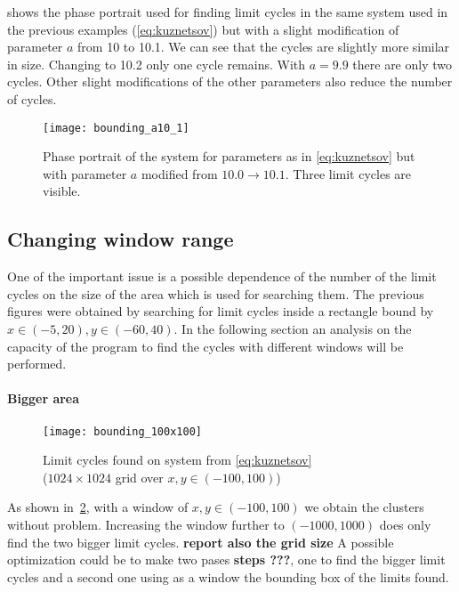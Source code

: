  shows the phase portrait used for finding limit cycles in the same system used in the previous examples (\cref{eq:kuznetsov}) but with a slight modification of parameter $a$ from 10 to 10.1. We can see that the cycles are slightly more similar in size. Changing to 10.2 only one cycle remains. With $a = 9.9$ there are only two cycles. Other slight modifications of the other parameters also reduce the number of cycles.

\begin{figure}[H]
    \centering
    \texttt{[image: bounding\_a10\_1]}
    \caption{Phase portrait of the system for parameters as in \cref{eq:kuznetsov} but with parameter $a$ modified from $10.0 \to 10.1$. Three limit cycles are visible.
    }
    \label{fig:bounding_a10_1}
\end{figure}

\pagebreak
\subsection{Changing window range}
One of the important issue is a possible dependence of the number of the limit cycles on the size of the area which is used for searching them. The previous figures were obtained by searching for limit cycles inside a rectangle bound by $x \in (-5, 20), y \in (-60, 40)$. In the following section an analysis on the capacity of the program to find the cycles with different windows will be performed.

\paragraph{Bigger area}

\begin{figure}[H]
    \centering
    \texttt{[image: bounding\_100x100]}
    \caption{Limit cycles found on system from \cref{eq:kuznetsov} \\
        ($1024 \times 1024$ grid over $x, y \in (-100, 100)$)
    }%
    \label{fig:bounding_100x100}
\end{figure}

As shown in~\cref{fig:bounding_100x100}, with a window of $x,y \in (-100,100)$ we obtain the clusters without problem. Increasing the window further to $(-1000, 1000)$ does only find the two bigger limit cycles. 
{\bf report also the grid size}
A possible optimization could be to make two pases {\bf steps ???}, one to find the bigger limit cycles and a second one using as a window the bounding box of the limits found.

